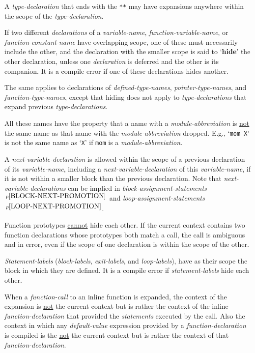 \documentclass[12pt]{article}
\newcommand{\key}[1]{{\rm \bfseries #1}}
\newcommand{\pagnote}[1]{$\,^{p\pageref{#1}}$}
\begin{document}
A {\em type-declaration} that ends with the {\tt ***}
may have expansions anywhere within the scope of the
{\em type-declaration}.

If two different {\em declarations} of a {\em variable-name},
{\em function-variable-name}, or {\em function-con\-stant-name}
have overlapping
scope, one of these must necessarily include the other,
and the declaration with the smaller scope is said to
`\key{hide}'\label{HIDE} the other declaration,
unless one {\em declaration} is deferred and the other is its companion.
It is a compile error if one of these declarations hides another.

The same applies to declarations of {\em defined-type-names},
{\em pointer-type-names}, and {\em function-type-names},
except that hiding does not
apply to {\em type-declarations} that expand previous
{\em type-declarations}.

All these names have the property that a name with a {\em module-abbreviation}
is \underline{not} the same name as that name with the {\em module-abbreviation}
dropped.  E.g., `{\tt mom X}' is not the same name as `{\tt X}' if
{\tt mom} is a {\em module-abbreviation}.

A {\em next-variable-declaration} is allowed
within the scope of a previous declaration of its {\em variable-name},
including a {\em next-variable-declaration} of this {\em variable-name},
if it is not within a smaller block than the previous declaration.
Note that {\em next-variable-declarations} can be implied
in {\em block-assignment-statements}\pagnote{BLOCK-NEXT-PROMOTION}
and {\em loop-assignment-statements}\pagnote{LOOP-NEXT-PROMOTION}.

Function prototypes \underline{cannot} hide each other.  If the
current context contains two function declarations whose prototypes
both match a call, the call is ambiguous and in error,
even if the scope of one declaration is within
the scope of the other.

{\em Statement-labels} ({\em block-labels},
{\em exit-labels}, and {\em loop-labels}), have as their scope
the block in which they are defined.  It is a compile
error if {\em statement-labels} hide each other.

When a {\em function-call} to an inline function is expanded,
the context of the expansion is \underline{not} the current context but
is rather the context of the inline {\em function-declaration}
that provided the {\em statements} executed by the call.
Also the context in which any {\em default-value} expression
provided by a {\em function-declaration} is compiled\label{DEFAULT-CONTEXT}
is the \underline{not} the current context but
is rather the context of that {\em function-declaration}.
\end{document}
